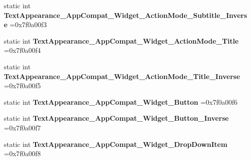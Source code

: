 \begin{DoxyCompactItemize}
\mbox{\label{classandroid_1_1support_1_1graphics_1_1drawable_1_1animated_1_1R_1_1style_ad0ea5aa9c8ef8c9f0c3d3713f976a942}} 
static int {\bfseries Text\+Appearance\+\_\+\+App\+Compat\+\_\+\+Widget\+\_\+\+Action\+Mode\+\_\+\+Subtitle\+\_\+\+Inverse} =0x7f0a00f3
\item 
\mbox{\label{classandroid_1_1support_1_1graphics_1_1drawable_1_1animated_1_1R_1_1style_ad572390b87cd43d0b8e9013fc14d1acf}} 
static int {\bfseries Text\+Appearance\+\_\+\+App\+Compat\+\_\+\+Widget\+\_\+\+Action\+Mode\+\_\+\+Title} =0x7f0a00f4
\item 
\mbox{\label{classandroid_1_1support_1_1graphics_1_1drawable_1_1animated_1_1R_1_1style_aeac370d71a12b6264713b5bf6ac442f1}} 
static int {\bfseries Text\+Appearance\+\_\+\+App\+Compat\+\_\+\+Widget\+\_\+\+Action\+Mode\+\_\+\+Title\+\_\+\+Inverse} =0x7f0a00f5
\item 
\mbox{\label{classandroid_1_1support_1_1graphics_1_1drawable_1_1animated_1_1R_1_1style_a161d7d2020a31d8540e1772c07552465}} 
static int {\bfseries Text\+Appearance\+\_\+\+App\+Compat\+\_\+\+Widget\+\_\+\+Button} =0x7f0a00f6
\item 
\mbox{\label{classandroid_1_1support_1_1graphics_1_1drawable_1_1animated_1_1R_1_1style_a23c0787ca786bdb68b7281a336fc448e}} 
static int {\bfseries Text\+Appearance\+\_\+\+App\+Compat\+\_\+\+Widget\+\_\+\+Button\+\_\+\+Inverse} =0x7f0a00f7
\item 
\mbox{\label{classandroid_1_1support_1_1graphics_1_1drawable_1_1animated_1_1R_1_1style_a99e677198b1ec342ea140b57ef9b177a}} 
static int {\bfseries Text\+Appearance\+\_\+\+App\+Compat\+\_\+\+Widget\+\_\+\+Drop\+Down\+Item} =0x7f0a00f8
\item 
\mbox{\label{classandroid_1_1support_1_1graphics_1_1drawable_1_1animated_1_1R_1_1style_a343d98e5414230a1fe800f8063878ccf}} 

\end{DoxyCompactItemize}
